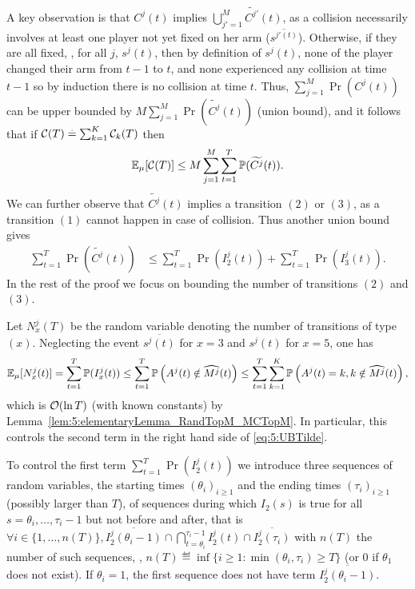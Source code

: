 \begin{smallproof}
  A key observation is that $C^j(t)$ implies $\bigcup_{j'=1}^M \widetilde{C^{j'}}(t)$, as a collision necessarily involves at least one player not yet fixed on her arm ($\overline{s^{j'(t)}}$).
  Otherwise, if they are all fixed, \ie, for all $j$, $s^j(t)$, then by definition of $s^j(t)$, none of the player changed their arm from $t-1$ to $t$, and none experienced any collision at time $t-1$ so by induction there is no collision at time $t$.
  Thus, $\sum_{j=1}^M \Pr(C^j(t))$ can be upper bounded by $M \sum_{j=1}^M \Pr(\widetilde{C^j}(t))$ (union bound),
  and it follows that if $\mathcal{C}(T) \overset{.}{=} \sum_{k=1}^K \mathcal{C}_k(T)$ then
  \[\mathbb{E}_{\mu}[\mathcal{C}(T)] \leq M \sum_{j=1}^M \sum_{t=1}^T \mathbb{P}(\widetilde{C^j}(t)).\]
  We can further  observe that $\widetilde{C^j}(t)$ implies a transition $(2)$ or $(3)$, as a transition $(1)$ cannot happen in case of collision. Thus another union bound gives
  \begin{align}
    \sum_{t=1}^T \Pr(\widetilde{C^j}(t))
    &\leq \sum_{t=1}^T \Pr(I_2^j(t))   + \sum_{t=1}^T \Pr(I_3^j(t)).\label{eq:5:UBTilde}
  \end{align}
  In the rest of the proof we focus on bounding the number of transitions $(2)$ and $(3)$.


  Let $N_x^j(T)$ be the random variable denoting the number of transitions of type $(x)$.
  Neglecting the event $\overline{s^j(t)}$ for $x=3$ and $s^j(t)$ for $x=5$, one has
  \begin{equation}
      \mathbb{E}_{\mu}[N_x^j(t)]
      = \sum_{t=1}^T \mathbb{P}(I_x^j(t))
      \leq \sum_{t=1}^T \mathbb{P} \left(A^j(t) \notin \widehat{M^j}(t)\right)
      \leq \sum_{t=1}^T \sum_{k=1}^K \mathbb{P} \left(A^j(t)=k, k \notin \widehat{M^j}(t)\right),
  \end{equation}
  which is $\mathop{}\mathopen{}\mathcal{O}\mathopen{}\left(\ln T\right)$ (with known constants) by Lemma~\ref{lem:5:elementaryLemma_RandTopM_MCTopM}. In particular, this controls the second term in the right hand side of \eqref{eq:5:UBTilde}.

  To control the first term $\sum_{t=1}^T \Pr(I_2^j(t))$
  we introduce three sequences of random variables,
  the starting times $(\theta_i)_{i \geq 1}$
  and the ending times $(\tau_i)_{i \geq 1}$
  (possibly larger than $T$),
  of sequences during which $I_2(s)$ is true for all $s=\theta_i,\dots,\tau_i-1$ but not before and after,
  that is
  $\forall i \in \{1,\dots,n(T)\},
  \overline{I_2^j(\theta_i - 1)}
  \cap \bigcap_{t=\theta_i}^{\tau_i-1} I_2^j(t)
  \cap \overline{I_2^j(\tau_i)}
  $
  with $n(T)$ the number of such sequences,
  \ie,
  $n(T) \eqdef \inf \{i \geq 1 : \min(\theta_i, \tau_i) \geq T \}$
  (or $0$ if $\theta_1$ does not exist).
  If $\theta_i = 1$, the first sequence does not have term $\overline{I_2^j(\theta_i - 1)}$.


\end{smallproof}
